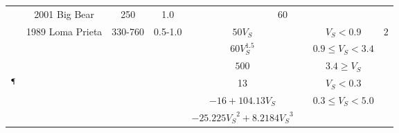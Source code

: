 \begin{table}[]
{\begin{tabular}{lccccccc}
			\citet{Graves_2008_BSSA}                                    		             & 2001 Big Bear                                            & 250                                   & 1.0                                            & \multicolumn{3}{c}{60\vs{}}                                                                                                           &                                                 \\ \cline{5-7}
			\multirow{3}{*}{\citet{Aagaard_2008_BSSA}}            			     & \multirow{3}{*}{1989 Loma Prieta}             & \multirow{3}{*}{330-760}   & \multirow{3}{*}{0.5-1.0}             & $50V_{S}$         &   & $V_{S}< 0.9$                           & \multirow{6}{*}{$2$\qs{}}  \\
			                                                                                    		  	     &                                                                    &                                         &                                                   & $60 V_{S}^{1.5}$                   &   & $0.9 \leq V_{S}<3.4$                   &                            \\
			                                                                                       		     &                                                                    &                                         &                                                  & $500$                              &   & $3.4 \geq V_{S}$                       &                            \\ \cline{5-7}
			\multirow{3}{*}{\citet{Brocher_2008_BSSA}$^\mathparagraph$}     &                                                                     &                                        &                                                   & 13                                 &   & $V_{S}<0.3$                            &                            \\
			                                                            					    &                                                                     &                                         &                                                   & $-16+104.13V_{S}$                  &   & \multirow{2}{*}{$0.3\leq V_{S} < 5.0$} &                            \\
			                                                            					    &                                                                     &                                         &                                                   & $-25.225{V_{S}}^2+8.2184{V_{S}}^3$ &   &                                        &                            \\ \hline

\end{tabular}}
\end{table}
